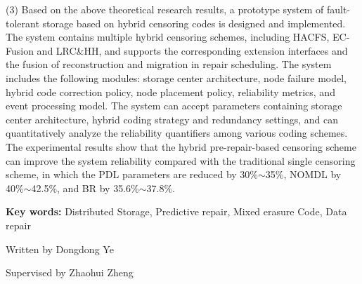 \begin{eabstract}
	(3) Based on the above theoretical research results, 
	a prototype system of fault-tolerant storage based on hybrid censoring codes is designed 
	and implemented. The system contains multiple hybrid censoring schemes, including HACFS, 
	EC-Fusion and LRC\&HH, and supports the corresponding extension interfaces and the fusion 
	of reconstruction and migration in repair scheduling. The system includes the following modules: 
	storage center architecture, node failure model, hybrid code correction policy, node placement policy, reliability metrics, and event
	processing model. The system can accept parameters containing storage center architecture, hybrid coding strategy and redundancy settings, 
	and can quantitatively analyze the reliability quantifiers among various coding schemes. 
	The experimental results show that the hybrid pre-repair-based censoring scheme can improve the system reliability 
	compared with the traditional single censoring scheme, in which the PDL parameters are reduced by 30\%$\sim$35\%, NOMDL by 40\%$\sim$42.5\%, and BR by 35.6\%$\sim$37.8\%.


	\vskip 21bp
	\noindent
	{\bf{} Key words: }
	Distributed Storage,
	Predictive repair,
	Mixed erasure Code,
	Data repair
\end{eabstract}

\begin{flushright}
	Written by Dongdong Ye
	
	Supervised by Zhaohui Zheng
	
\end{flushright}
